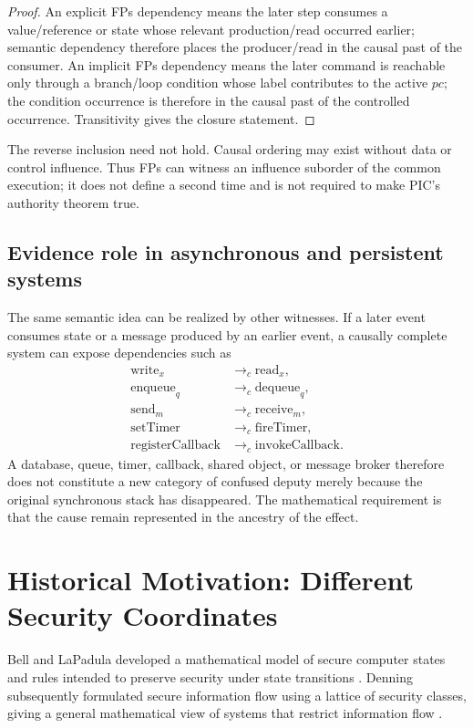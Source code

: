 \documentclass[10pt,twocolumn]{article}
\begin{document}
\begin{proof}
An explicit FPs dependency means the later step consumes a value/reference or
state whose relevant production/read occurred earlier; semantic dependency
therefore places the producer/read in the causal past of the consumer.  An
implicit FPs dependency means the later command is reachable only through a
branch/loop condition whose label contributes to the active $pc$; the condition
occurrence is therefore in the causal past of the controlled occurrence.
Transitivity gives the closure statement.
\end{proof}

The reverse inclusion need not hold.  Causal ordering may exist without data or
control influence.  Thus FPs can witness an influence suborder of the common
execution; it does not define a second time and is not required to make PIC's
authority theorem true.

\subsection{Evidence role in asynchronous and persistent systems}

The same semantic idea can be realized by other witnesses.  If a later event
consumes state or a message produced by an earlier event, a causally complete
system can expose dependencies such as
\begin{align}
  \mathrm{write}_x &\to_c \mathrm{read}_x,\\
  \mathrm{enqueue}_q &\to_c \mathrm{dequeue}_q,\\
  \mathrm{send}_m &\to_c \mathrm{receive}_m,\\
  \mathrm{setTimer} &\to_c \mathrm{fireTimer},\\
  \mathrm{registerCallback} &\to_c \mathrm{invokeCallback}.
\end{align}
A database, queue, timer, callback, shared object, or message broker therefore
does not constitute a new category of confused deputy merely because the
original synchronous stack has disappeared.  The mathematical requirement is
that the cause remain represented in the ancestry of the effect.


\section{Historical Motivation: Different Security Coordinates}

Bell and LaPadula developed a mathematical model of secure computer states and
rules intended to preserve security under state transitions
\cite{bell_lapadula1973,bell_lapadula1973model}.  Denning subsequently formulated secure information
flow using a lattice of security classes, giving a general mathematical view of
systems that restrict information flow \cite{denning1976}.
\end{document}
